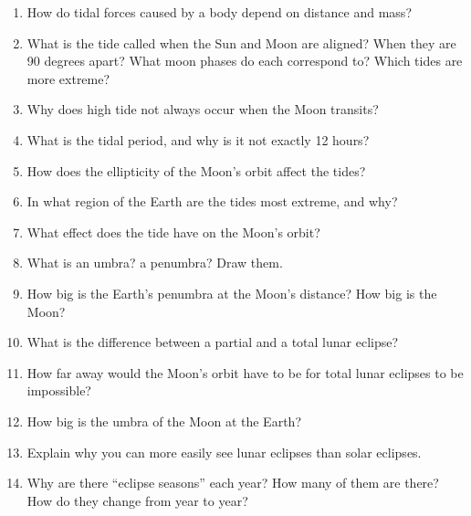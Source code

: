 
\begin{enumerate}
\item How do tidal forces caused by a body depend on distance and
  mass?
\vspace{80pt}
\item What is the tide called when the Sun and Moon are aligned? When
  they are 90 degrees apart?  What moon phases do each correspond to?
  Which tides are more extreme? 
\vspace{80pt}
\item Why does high tide not always occur when the Moon transits?
\vspace{80pt}
\item What is the tidal period, and why is it not exactly 12 hours?
\vspace{80pt}
\item How does the ellipticity of the Moon's orbit affect the tides?
\vspace{80pt}
\item In what region of the Earth are the tides most extreme, and why?
\vspace{80pt}
\item What effect does the tide have on the Moon's orbit?
\vspace{80pt}
\item What is an umbra? a penumbra? Draw them.
\vspace{80pt}
\item How big is the Earth's penumbra at the Moon's distance? How big
  is the Moon? 
\vspace{80pt}
\item What is the difference between a partial and a total lunar
  eclipse?
\vspace{80pt}
\item How far away would the Moon's orbit have to be for total lunar
  eclipses to be impossible?
\vspace{80pt}
\item How big is the umbra of the Moon at the Earth?
\vspace{80pt}
\item Explain why you can more easily see lunar eclipses than solar
  eclipses. 
\vspace{80pt}
\item Why are there ``eclipse seasons'' each year? How many of them
  are there? How do they change from year to year?
\vspace{80pt}
\end{enumerate}
